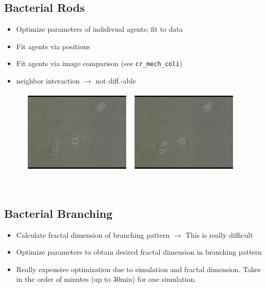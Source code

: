 \documentclass{article}
\newcommand{\todo}[1]{\colorbox{WildStrawberry}{\textcolor{white}{#1}}}
\begin{document}
\subsection{Bacterial Rods}
\label{subsection:bacterial-rods}
\begin{itemize}
    \item Optimize parameters of indidivual agents; fit to data
    \item Fit agents via positions
    \item Fit agents via image comparison (see \texttt{cr\_mech\_coli})
    \item neighbor interaction $\rightarrow$ not diff.-able
\end{itemize}

\begin{figure}[H]
    \centering
    \includegraphics[width=0.48\textwidth]{figures/cr_mech_coli/estim-param/microscopic-images-0.png}%
    \hspace{0.04\textwidth}%
    \includegraphics[width=0.48\textwidth]{figures/cr_mech_coli/estim-param/microscopic-images-1.png}%
    \caption{\todo{caption}}
    \label{fig:bacterial-rods-sim}
\end{figure}

\subsection{Bacterial Branching}
\label{subsection:bacterial-branching}
\begin{itemize}
    \item Calculate fractal dimension of branching pattern $\rightarrow$ This is really difficult
    \item Optimize parameters to obtain desired fractal dimension in branching pattern
    \item Really expensive optimization due to simulation and fractal dimension.
        Takes in the order of minutes (up to $30$min) for one simulation.
\end{itemize}
\end{document}
